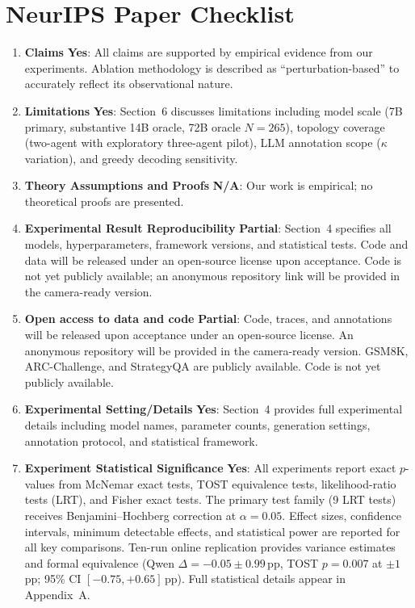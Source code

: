 \documentclass{article}
\renewcommand{\answerYes}[1]{\textbf{Yes}: #1}
\renewcommand{\answerNA}[1]{\textbf{N/A}: #1}
\newcommand{\answerPartial}[1]{\textbf{Partial}: #1}
\newcommand{\qwenSevenTwoBN}{265}
\begin{document}
\section*{NeurIPS Paper Checklist}

\begin{enumerate}

\item {\bf Claims}
    \answerYes{All claims are supported by empirical evidence from our experiments. Ablation methodology is described as ``perturbation-based'' to accurately reflect its observational nature.}

\item {\bf Limitations}
    \answerYes{Section~6 discusses limitations including
model scale (7B primary, substantive 14B oracle, 72B oracle $N{=}\qwenSevenTwoBN{}$), topology coverage (two-agent with exploratory three-agent pilot), LLM annotation scope ($\kappa$ variation), and greedy decoding sensitivity.}

\item {\bf Theory Assumptions and Proofs}
    \answerNA{Our work is empirical; no theoretical proofs are presented.}

\item {\bf Experimental Result Reproducibility}
    \answerPartial{Section~4 specifies all models, hyperparameters, framework versions, and statistical tests. Code and data will be released under an open-source license upon acceptance. Code is not yet publicly available; an anonymous repository link will be provided in the camera-ready version.}

\item {\bf Open access to data and code}
    \answerPartial{Code, traces, and annotations will be released upon acceptance under an open-source license. An anonymous repository will be provided in the camera-ready version. GSM8K, ARC-Challenge, and StrategyQA are publicly available. Code is not yet publicly available.}

\item {\bf Experimental Setting/Details}
    \answerYes{Section~4 provides full experimental details including model names, parameter counts, generation settings, annotation protocol, and statistical framework.}

\item {\bf Experiment Statistical Significance}
    \answerYes{All experiments report exact $p$-values from McNemar exact tests, TOST equivalence tests, likelihood-ratio tests (LRT), and Fisher exact tests. The primary test family (9 LRT tests) receives Benjamini--Hochberg correction at $\alpha = 0.05$. Effect sizes, confidence intervals, minimum detectable effects, and statistical power are reported for all key comparisons. Ten-run online replication provides variance estimates and formal equivalence (Qwen $\Delta = -0.05 \pm 0.99$\,pp, TOST $p = 0.007$ at $\pm 1$\,pp; 95\% CI $[-0.75, +0.65]$\,pp). Full statistical details appear in Appendix~A.}


\end{enumerate}
\end{document}

